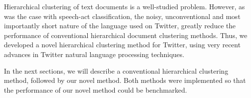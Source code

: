 \documentclass[letterpaper]{article}
\begin{document}



Hierarchical clustering of text documents is a well-studied problem. However, as was the case with speech-act classification, the noisy, unconventional and most importantly short nature of the language used on Twitter, greatly reduce the performance of conventional hierarchical document clustering methods. Thus, we developed a novel hierarchical clustering method for Twitter, using very recent advances in Twitter natural language processing techniques.

In the next sections, we will describe a conventional hierarchical clustering method, followed by our novel method. Both methods were implemented so that the performance of our novel method could be benchmarked.


\end{document}
